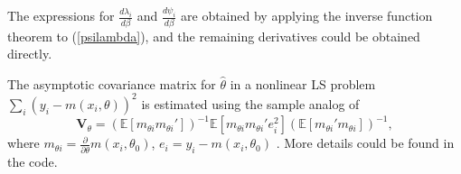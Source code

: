 \documentclass[12pt,pagebackref]{article}
\begin{document}
\noindent The expressions for \(\frac{d \lambda_i}{d \beta}\) and
\(\frac{d \psi_i}{d \beta}\) are obtained by applying the inverse
function theorem to (\ref{psilambda}), and the remaining derivatives
could be obtained directly.

The asymptotic covariance matrix for \(\hat \theta\) in a nonlinear LS
problem \(\sum_i (y_i - m(x_i, \theta))^2\) is estimated using the
sample analog of \begin{equation}
\mathbf V_\theta = \left(\mathbb{E}\left[m_{\theta i}m_{\theta i}'\right]\right)^{-1}
                \mathbb{E}\left[m_{\theta i}m_{\theta i}'e_i^2\right]
                \left(\mathbb{E}\left[m_{\theta i}'m_{\theta i}\right]\right)^{-1},
\end{equation} where
\(m_{\theta i} = \frac{\partial}{\partial \theta} m(x_i, \theta_0)\),
\(e_i = y_i - m(x_i, \theta_0)\) \citep[p.751]{Hansen20}. More details
could be found in the code.

\newpage


\end{document}

